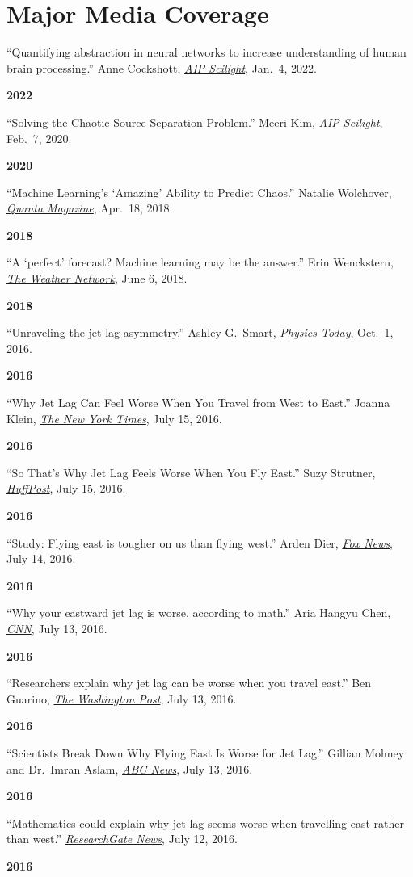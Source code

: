 \documentclass[11pt]{article}
\newcommand{\entry}[2]{%
  \par\smallskip\noindent
  \begin{minipage}[t]{0.80\textwidth}\raggedright #1\end{minipage}\hfill
  \begin{minipage}[t]{0.18\textwidth}\raggedleft\textbf{#2}\end{minipage}\par}
\let\cvOriginalSection\section
\renewcommand{\section}{\Needspace{5\baselineskip}\cvOriginalSection}
\begin{document}
\section{Major Media Coverage}
\entry{``Quantifying abstraction in neural networks to increase understanding of human brain
  processing.'' Anne Cockshott, \href{https://aip.scitation.org/doi/10.1063/10.0009079}{\emph{AIP Scilight}}, Jan.\ 4, 2022.}{2022}
\entry{``Solving the Chaotic Source Separation Problem.'' Meeri Kim,
  \href{https://aip.scitation.org/doi/10.1063/10.0000783}{\emph{AIP Scilight}}, Feb.\ 7, 2020.}{2020}
\entry{``Machine Learning's `Amazing' Ability to Predict Chaos.'' Natalie Wolchover,
  \href{https://www.quantamagazine.org/machine-learnings-amazing-ability-to-predict-chaos-20180418/}{\emph{Quanta Magazine}}, Apr.\ 18, 2018.}{2018}
\entry{``A `perfect' forecast? Machine learning may be the answer.'' Erin Wenckstern,
  \href{https://www.theweathernetwork.com/news/articles/artificial-intelligence-machine-learning-robots-weather-prediction-chaos-theory-mathematics-university-of-maryland/102924}{\emph{The Weather Network}}, June 6, 2018.}{2018}
\entry{``Unraveling the jet-lag asymmetry.'' Ashley G.\ Smart,
  \href{https://physicstoday.scitation.org/doi/10.1063/PT.3.3323}{\emph{Physics Today}}, Oct.\ 1, 2016.}{2016}
\entry{``Why Jet Lag Can Feel Worse When You Travel from West to East.'' Joanna Klein,
  \href{https://www.nytimes.com/2016/07/16/science/jet-lag-east-west.html}{\emph{The New York Times}}, July 15, 2016.}{2016}
\entry{``So That's Why Jet Lag Feels Worse When You Fly East.'' Suzy Strutner,
  \href{https://www.huffpost.com/entry/jet-lag-circadian-rhythm_n_5788e090e4b0867123e0c6cd}{\emph{HuffPost}}, July 15, 2016.}{2016}
\entry{``Study: Flying east is tougher on us than flying west.'' Arden Dier,
  \href{https://www.foxnews.com/travel/study-flying-east-is-tougher-on-us-than-flying-west}{\emph{Fox News}}, July 14, 2016.}{2016}
\entry{``Why your eastward jet lag is worse, according to math.'' Aria Hangyu Chen,
  \href{https://www.cnn.com/2016/07/13/health/eastward-jet-lag-worse/index.html}{\emph{CNN}}, July 13, 2016.}{2016}
\entry{``Researchers explain why jet lag can be worse when you travel east.'' Ben Guarino,
  \href{https://www.washingtonpost.com/news/morning-mix/wp/2016/07/13/researchers-explain-why-jet-lag-can-be-worse-when-you-travel-east/}{\emph{The Washington Post}}, July 13, 2016.}{2016}
\entry{``Scientists Break Down Why Flying East Is Worse for Jet Lag.'' Gillian Mohney and
  Dr.\ Imran Aslam, \href{https://abcnews.go.com/Health/scientists-break-flying-east-worse-jet-lag/story?id=40521154}{\emph{ABC News}}, July 13, 2016.}{2016}
\entry{``Mathematics could explain why jet lag seems worse when travelling east rather than
  west.'' \href{https://www.researchgate.net/blog/post/mathematics-could-explain-why-jet-lag-seems-worse-when-travelling-east-rather-than-west}{\emph{ResearchGate News}}, July 12, 2016.}{2016}
\end{document}
